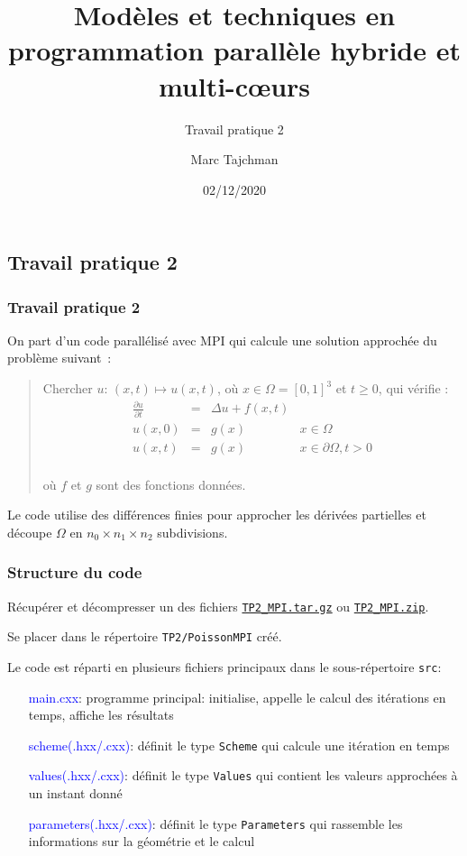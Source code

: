 \documentclass{beamer}
\title{Modèles et techniques en programmation parallèle hybride et multi-c\oe urs}
\subtitle{Travail pratique 2}
\author{Marc Tajchman}\institute{CEA - DEN/DM2S/STMF/LMES}
\date{02/12/2020}
\newcommand\Frac[2]{\frac{\displaystyle #1}{\displaystyle #2}}
\begin{document}
\begin{frame}
	\titlepage
\end{frame}

\large
\begin{frame}
	\section{Travail pratique 2}
	\frametitle{Travail pratique 2}

On  part d'un code parallélisé avec MPI qui calcule une solution approchée du problème suivant~:

\medskip
\begin{quote}
Chercher $u$:  $(x, t) \mapsto u(x, t)$, où  $x \in \Omega = [0,1]^3$ et $t \geq 0$, qui vérifie :
$$
\begin{array}{lcll}
\Frac{\partial u}{\partial t} & = & \Delta u + f(x, t) & \\[0.3cm]
u(x, 0) &=& g(x) & x\in \Omega \\[0.3cm]
u(x, t) & = & g(x) & x\in\partial \Omega, t > 0\\[0.3cm]
\end{array}
$$

\vspace{-0.6cm}
où $f$ et $g$ sont des fonctions données.
\end{quote}

Le code utilise des différences finies pour approcher les dérivées partielles et découpe $\Omega$ en $n_0\times n_1\times n_2$ subdivisions.

\end{frame}

\begin{frame}
	\frametitle{Structure du code}
	
	Récupérer et décompresser un des fichiers \href{https://perso.ensta-paris.fr/~tajchman/Seance5/TP2_MPI.tar.gz}{\tt TP2\_MPI.tar.gz} ou \href{https://perso.ensta-paris.fr/~tajchman/Seance5/TP2_MPI.zip}{\tt TP2\_MPI.zip}.
	
    \medskip
	 Se placer dans le répertoire {\tt TP2/PoissonMPI} créé. 
	
	Le code est réparti en plusieurs fichiers principaux dans le sous-répertoire {\tt src}:
    \medskip
    
	\hfill\begin{minipage}{8cm}
	\begin{itemize}
		\item[\textcolor{blue}{main.cxx}:] programme principal: initialise, appelle le calcul des itérations en temps, affiche les résultats 
		\item[\textcolor{blue}{scheme(.hxx/.cxx)}:] définit le type {\tt Scheme} qui calcule une itération en temps
		\item[\textcolor{blue}{values(.hxx/.cxx)}:] définit le type {\tt Values} qui contient les valeurs approchées à un instant donné
		\item[\textcolor{blue}{parameters(.hxx/.cxx)}:] définit le type {\tt Parameters} qui rassemble les informations sur la géométrie et le calcul
	\end{itemize}
    \end{minipage}
\vfill
\end{frame}
\end{document}
